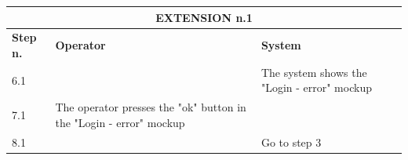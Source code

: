 {{{\begin{center}
			\begin{tabular}{|p{2cm}|p{6cm}|p{6cm}|}
			\hline
				\multicolumn{3}{|c|}{EXTENSION n.1} \\
			\hline
				\centering \vspace{1mm} \bfseries{Step n.} \vspace{1mm} & \vspace{1mm} \bfseries{Operator} \vspace{1mm} & \vspace{1mm} \bfseries{System} \vspace{1mm}\\
			\hline
				\vspace{1mm} 6.1 \vspace{1mm} &
				\vspace{1mm} \vspace{1mm} & 
				\vspace{1mm} The system shows the "Login - error" mockup\vspace{1mm} \\
			\hline
				\vspace{1mm} 7.1 \vspace{1mm} &
				\vspace{1mm} The operator presses the "ok" button in the "Login - error" mockup\vspace{1mm} & 
				\vspace{1mm} \vspace{1mm} \\
			\hline
				\vspace{1mm} 8.1 \vspace{1mm} &
				\vspace{1mm} \vspace{1mm} & 
				\vspace{1mm} Go to step 3 \vspace{1mm} \\
			\hline
			\end{tabular}
			\end{center}
			

			\clearpage

}}}
